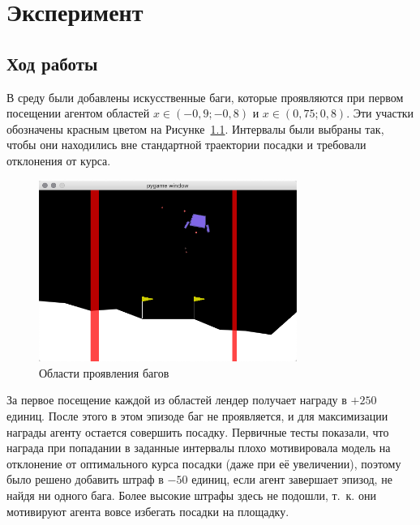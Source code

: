\begingroup
\titleformat{\chapter}{\normalfont\centering}{\chaptertitlename \thechapter}{14pt}{}
\titlespacing*{\chapter}{0pt}{-50pt}{0pt}

\chapter{Эксперимент}
\label{cha:research}

\section{Ход работы}

В среду были добавлены искусственные баги, которые проявляются при первом посещении агентом областей \(x \in (-0,9; -0,8)\) и \(x \in (0,75; 0,8)\). Эти участки обозначены красным цветом на Рисунке~\ref{fig:bugLocations}. Интервалы были выбраны так, чтобы они находились вне стандартной траектории посадки и требовали отклонения от курса.

\begin{figure}
	\centering
	\includegraphics[width=0.75\textwidth]{figures/bug locations}
	\caption{Области проявления багов}
	\label{fig:bugLocations}
\end{figure}

За первое посещение каждой из областей лендер получает награду в \(+250\) единиц. После этого в этом эпизоде баг не проявляется, и для максимизации награды агенту остается совершить посадку. Первичные тесты показали, что награда при попадании в заданные интервалы плохо мотивировала модель на отклонение от оптимального курса посадки (даже при её увеличении), поэтому было решено добавить штраф в \(-50\) единиц, если агент завершает эпизод, не найдя ни одного бага. Более высокие штрафы здесь не подошли, т.~к. они мотивируют агента вовсе избегать посадки на площадку.

